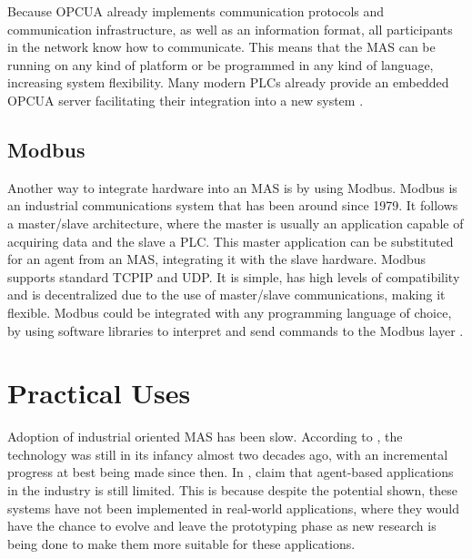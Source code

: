 Because \gls{OPCUA} already implements communication protocols and communication infrastructure, as well as an information format, all participants in the network know how to communicate. This means that the \gls{MAS} can be running on any kind of platform or be programmed in any kind of language, increasing system flexibility. Many modern \gls{PLC}s already provide an embedded \gls{OPCUA} server facilitating their integration into a new system \cite{Seitz2021}.

\subsection{Modbus}

Another way to integrate hardware into an \gls{MAS} is by using Modbus. Modbus is an industrial communications system that has been around since 1979. It follows a master/slave architecture, where the master is usually an application capable of acquiring data and the slave a \gls{PLC}. This master application can be substituted for an agent from an \gls{MAS}, integrating it with the slave hardware. Modbus supports standard \gls{TCPIP} and \gls{UDP}. It is simple, has high levels of compatibility and is decentralized due to the use of master/slave communications, making it flexible. Modbus could be integrated with any programming language of choice, by using software libraries to interpret and send commands to the Modbus layer \cite{10084891}.
\section{Practical Uses}
\label{sec:practical_uses}

Adoption of industrial oriented \gls{MAS} has been slow. According to \citeauthor{karnouskos02} \cite{karnouskos02}, the technology was still in its infancy almost two decades ago, with an incremental progress at best being made since then. In \cite{Karnouskos2019}, \citeauthor{Karnouskos2019} claim that agent-based applications in the industry is still limited. This is because despite the potential shown, these systems have not been implemented in real-world applications, where they would have the chance to evolve and leave the prototyping phase as new research is being done to make them more suitable for these applications.\\

